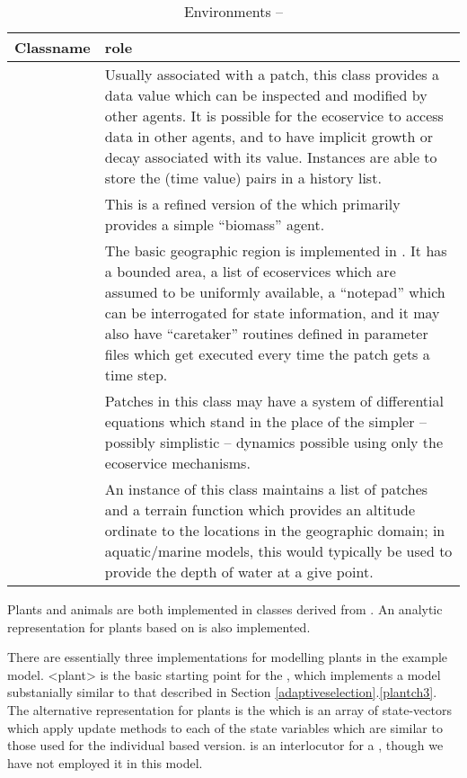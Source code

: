 \begin{table}[H]
\begin{center}
\caption{Environments -- \label{classtable4}}
\begin{tabular}{l L{7cm}}
\toprule
\textbf{Classname} & \textbf{role} \\
\midrule
{} & Usually associated with a patch, this class
provides a data value which can be inspected and modified by other
agents.  It is possible for the ecoservice to access data in other
agents, and to have implicit growth or decay associated with its
value.  Instances are able to store the (time value) pairs in a
history list.\\
 & This is a refined version of
the  which primarily provides a simple ``biomass''
agent.\\
 & The basic geographic region is implemented in
. It has a bounded area,  a list of ecoservices which
are assumed to be uniformly available, a ``notepad'' which can be
interrogated for state information, and it may also have ``caretaker''
routines defined in parameter files which get executed every time the
patch gets a time step.\\
 & Patches  in this class may have a system of
differential equations which stand in the place of the simpler --
possibly simplistic -- dynamics possible using only the ecoservice
mechanisms.\\
 & An instance of this class maintains a list of
patches and a terrain function which provides an altitude ordinate to
the locations in the geographic domain; in aquatic/marine models, this
would typically be used to provide the depth of water at a give point.\\
\bottomrule
\end{tabular}
\end{center}
\end{table}


Plants and animals are both implemented in classes derived
from . An analytic representation for plants
based on  is also implemented.

There are essentially three implementations for modelling plants in
the example model. \mclass<plant> is the basic starting point for
the , which implements a model substanially
similar to that described in Section \ref{adaptiveselection}.\ref{plantch3}. The alternative
representation for plants is the  which is an
array of state-vectors which apply update methods to each of the state
variables which are similar to those used for the individual based
version.  is an interlocutor for
a , though we have not employed it in this model.\\

